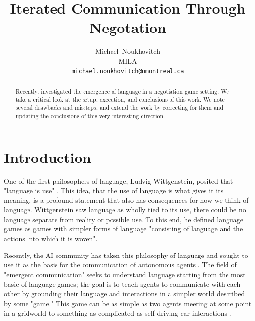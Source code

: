 \documentclass{article}
\title{Iterated Communication Through Negotation}
\author{
  Michael~Noukhovitch\\
  MILA\\
  \texttt{michael.noukhovitch@umontreal.ca} \\
}
\begin{document}
\maketitle

\begin{abstract}
    Recently, \cite{cao2018emergent} investigated the emergence of language in a
    negotiation game setting. We take a critical look at the setup, execution,
    and conclusions of this work. We note several drawbacks and missteps, and
    extend the work by correcting for them and updating the conclusions of this
    very interesting direction.
\end{abstract}

\section{Introduction}

One of the first philosophers of language, Ludvig Wittgenstein, posited that
"language is use" \cite{wittgenstein2009philosophical}. This idea, that the use
of language is what gives it its meaning, is a profound statement that also has
consequences for how we think of language. Wittgenstein saw language as wholly
tied to its use, there could be no language separate from reality or possible
use. To this end, he defined language games as games with simpler forms of
language "consisting of language and the actions into which it is woven".

Recently, the AI community has taken this philosophy of language and sought to
use it as the basis for the communication of autonomous agents
\cite{wagner2003progress}. The field of "emergent communication" seeks to
understand language starting from the most basic of language games; the goal is
to teach agents to communicate with each other by grounding their language and
interactions in a simpler world described by some "game." This game can be as
simple as two agents meeting at some point in a gridworld
\cite{goldman2007learning} to something as complicated as self-driving car
interactions \cite{resnick2018vehicle}.
\end{document}
